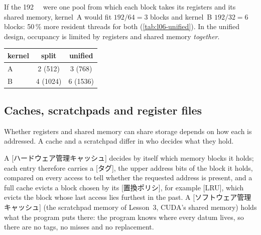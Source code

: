 \documentclass[../main.tex]{subfiles}
\begin{document}
If the \SI{192}{\kibi\byte} were one pool from which each block takes
its registers and its shared memory, kernel~A would fit
$192/64 = 3$ blocks and kernel~B $192/32 = 6$ blocks: 50\,\% more
resident threads for both (\cref{tab:l06-unified}).  In the unified design, occupancy is
limited by registers and shared memory \emph{together}.

\begin{margintable}
  \caption{Resident blocks (threads) per SM for the kernels of
    \cref{fig:l06-unified-pool}.}
  \label{tab:l06-unified}
  \begin{tabular}{@{}lcc@{}}
    \toprule
    kernel & split & unified \\
    \midrule
    A & 2 (512) & 3 (768) \\
    B & 4 (1024) & 6 (1536) \\
    \bottomrule
  \end{tabular}
\end{margintable}

\subsection{Caches, scratchpads and register files}

Whether registers and shared memory can share storage depends on how
each is addressed.  A cache and a scratchpad differ in who decides what
they hold.

\begin{definition}
  \label{def:l06-managed-caches}
  A [ハードウェア管理キャッシュ] decides by
  itself which memory blocks it holds; each entry therefore carries a
  [タグ], the upper address bits of the block it holds,
  compared on every access to tell whether the requested address is
  present, and a full cache
  evicts a block chosen by its
  [置換ポリシ], for example
  [LRU], which evicts the block whose
  last access lies furthest in the past.  A
  [ソフトウェア管理キャッシュ] (the
  scratchpad memory of Lesson~3, CUDA's shared memory) holds what the
  program puts there: the program knows where every datum lives, so
  there are no tags, no misses and no replacement.
\end{definition}
\end{document}
